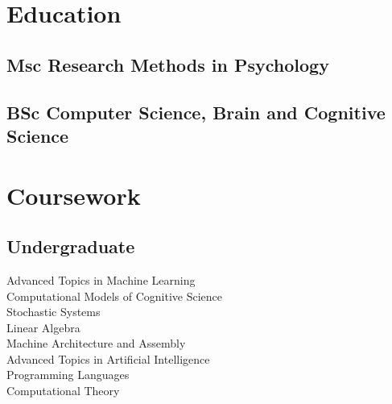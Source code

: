 \documentclass[]{csaund_resume-openfont}
\begin{document}
%
%

%
%

%
%

\begin{minipage}[t]{0.30\textwidth}


\section{Education}

\subsection{Msc Research Methods in Psychology}
\sectionsep

\subsection{BSc Computer Science, Brain and Cognitive Science}
\sectionsep




\section{Coursework}
\subsection{Undergraduate}
Advanced Topics in Machine Learning \\
Computational Models of Cognitive Science \\
Stochastic Systems \\
Linear Algebra \\
Machine Architecture and Assembly \\
Advanced Topics in Artificial Intelligence \\
Programming Languages \\
Computational Theory \\
\sectionsep


\end{minipage}
\end{document}

